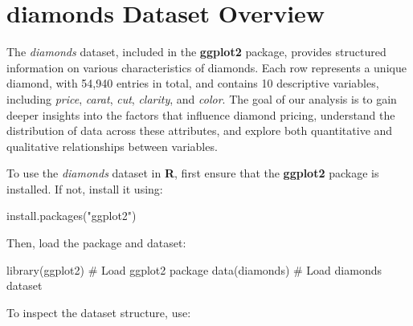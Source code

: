 \documentclass[
  11pt,
]{book}
\makeatletter
\newenvironment{Shaded}{}{}
\newcommand{\CommentTok}[1]{\textcolor[rgb]{0.36,0.36,0.36}{#1}}
\newcommand{\FunctionTok}[1]{#1}
\newcommand{\NormalTok}[1]{#1}
\newcommand{\StringTok}[1]{\textcolor[rgb]{0.39,0.39,0.39}{#1}}
\newenvironment{kframe}{%
\medskip{}
\setlength{\fboxsep}{.8em}
 \def\at@end@of@kframe{}%
 \ifinner\ifhmode%
  \def\at@end@of@kframe{\end{minipage}}%
  \begin{minipage}{\columnwidth}%
 \fi\fi%
 \def\FrameCommand##1{\hskip\@totalleftmargin \hskip-\fboxsep
 \colorbox{shadecolor}{##1}\hskip-\fboxsep
     \hskip-\linewidth \hskip-\@totalleftmargin \hskip\columnwidth}%
 \MakeFramed {\advance\hsize-\width
   \@totalleftmargin\z@ \linewidth\hsize
   \@setminipage}}%
 {\par\unskip\endMakeFramed%
 \at@end@of@kframe}
\renewenvironment{Shaded}{\begin{kframe}}{\end{kframe}}
\theoremstyle{definition}
\theoremstyle{definition}
\theoremstyle{definition}
\theoremstyle{definition}
\theoremstyle{remark}
\makeatother
\begin{document}
\section{diamonds Dataset Overview}\label{Data-pre-diamonds}

The \emph{diamonds} dataset, included in the \textbf{ggplot2} package, provides structured information on various characteristics of diamonds. Each row represents a unique diamond, with 54,940 entries in total, and contains 10 descriptive variables, including \emph{price}, \emph{carat}, \emph{cut}, \emph{clarity}, and \emph{color}. The goal of our analysis is to gain deeper insights into the factors that influence diamond pricing, understand the distribution of data across these attributes, and explore both quantitative and qualitative relationships between variables.

To use the \emph{diamonds} dataset in \textbf{R}, first ensure that the \textbf{ggplot2} package is installed. If not, install it using:

\begin{Shaded}
\begin{Highlighting}[]
\FunctionTok{install.packages}\NormalTok{(}\StringTok{"ggplot2"}\NormalTok{) }
\end{Highlighting}
\end{Shaded}

Then, load the package and dataset:

\begin{Shaded}
\begin{Highlighting}[]
\FunctionTok{library}\NormalTok{(ggplot2)  }\CommentTok{\# Load ggplot2 package}
\FunctionTok{data}\NormalTok{(diamonds)    }\CommentTok{\# Load diamonds dataset}
\end{Highlighting}
\end{Shaded}

To inspect the dataset structure, use:
\end{document}
